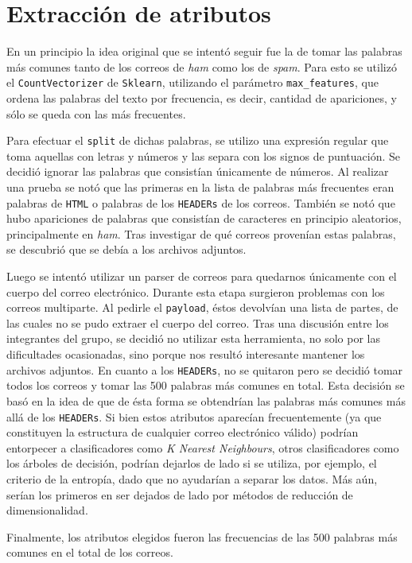 \section{Extracción de atributos}

En un principio la idea original que se intentó seguir fue la de tomar las palabras más comunes tanto de los correos de \emph{ham} como los de \emph{spam}. Para esto se utilizó el \texttt{CountVectorizer} de \texttt{Sklearn}, utilizando el parámetro \texttt{max\_features}, que ordena las palabras del texto por frecuencia, es decir, cantidad de apariciones, y sólo se queda con las más frecuentes.

Para efectuar el \texttt{split} de dichas palabras, se utilizo una expresión regular que toma aquellas con letras y números y las separa con los signos de puntuación. Se decidió ignorar las palabras que consistían únicamente de números. Al realizar una prueba se notó que las primeras en la lista de palabras más frecuentes eran palabras de \texttt{HTML} o palabras de los \texttt{HEADERs} de los correos. También se notó que hubo apariciones de palabras que consistían de caracteres en principio aleatorios, principalmente en \emph{ham}. Tras investigar de qué correos provenían estas palabras, se descubrió que se debía a los archivos adjuntos.

Luego se intentó utilizar un parser de correos\textsuperscript{\cite{parser}} para quedarnos únicamente con el cuerpo del correo electr\'onico. Durante esta etapa surgieron problemas con los correos multiparte. Al pedirle el \texttt{payload}, éstos devolvían una lista de partes, de las cuales no se pudo extraer el cuerpo del correo. Tras una discusión entre los integrantes del grupo, se decidió no utilizar esta herramienta, no solo por las dificultades ocasionadas, sino porque nos result\'o interesante mantener los archivos adjuntos. En cuanto a los \texttt{HEADERs}, no se quitaron pero se decidió tomar todos los correos y tomar las 500 palabras más comunes en total. Esta decisión se basó en la idea de que de ésta forma se obtendrían las palabras más comunes más allá de los \texttt{HEADERs}. Si bien estos atributos aparec\'ian frecuentemente (ya que constituyen la estructura de cualquier correo electr\'onico v\'alido) podrían entorpecer a clasificadores como \emph{K Nearest Neighbours}, otros clasificadores como los árboles de decisión, podrían dejarlos de lado si se utiliza, por ejemplo, el criterio de la entropía, dado que no ayudarían a separar los datos. Más aún, serían los primeros en ser dejados de lado por métodos de reducción de dimensionalidad.

Finalmente, los atributos elegidos fueron las frecuencias de las 500 palabras más comunes en el total de los correos.